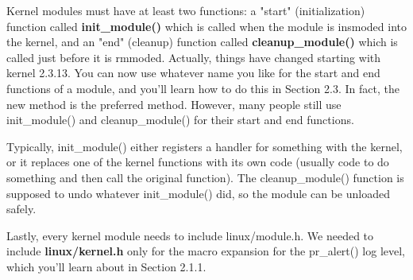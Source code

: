 \documentclass[11pt]{article}
\begin{document}
Kernel modules must have at least two functions: a "start" (initialization) function called \textbf{init\_module()} which is called when the module is insmoded into the kernel, and an "end" (cleanup) function called \textbf{cleanup\_module()} which is called just before it is rmmoded. Actually, things have changed starting with kernel 2.3.13. You can now use whatever name you like for the
start and end functions of a module, and you'll learn how to do this in Section 2.3. In fact, the new method is the preferred method. However, many people still use init\_module() and cleanup\_module() for their start and end functions.

Typically, init\_module() either registers a handler for something with the kernel, or it replaces one of the kernel functions with its own code (usually code to do something and then call the original function). The cleanup\_module() function is supposed to undo whatever init\_module() did, so the module can be unloaded safely.

Lastly, every kernel module needs to include linux/module.h. We needed to include \textbf{linux/kernel.h} only for the macro expansion for the pr\_alert() log level, which you'll learn about in Section 2.1.1.
\end{document}
